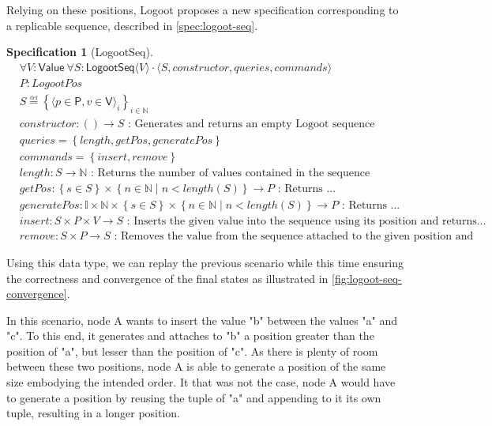 \documentclass{article}
\newcommand{\commands}[1]{commands = \set{#1}}
\newcommand{\defeq}{\overset{\underset{\mathrm{def}}{}}{=}}
\newcommand{\fnspec}[3]{#1: #2 \text{ : #3}}
\newcommand{\inbb}[1]{\in \mathbb{#1}}
\newcommand{\queries}[1]{queries = \set{#1}}
\newcommand{\set}[1]{\left\{#1\right\}} %
\newcommand{\spectuple}[1]{\tuple{#1, constructor, queries, commands}}
\newcommand{\ssep}{\mid} %
\newcommand{\tuple}[1]{\langle #1 \rangle}
\theoremstyle{definition}
\theoremstyle{definition}
\theoremstyle{definition}
\newcounter{specificationcounter}
\theoremstyle{definition}
\newtheorem{specification}[specificationcounter]{Specification}
\begin{document}
Relying on these positions, Logoot proposes a new specification corresponding to a replicable sequence, described in \autoref{spec:logoot-seq}.

\begin{specification}[LogootSeq]
    \begin{align*}
    &\forall V: \mathsf{Value} \ \forall S: \mathsf{LogootSeq} \tuple{V} \cdot \spectuple{S}\\
    &P: LogootPos\\
    &S \defeq \set{\tuple{p \in \mathsf{P}, v \in \mathsf{V}}_i}_{i \inbb{N}}\\
    &\fnspec{constructor}{\left( \right) \to S}{Generates and returns an empty Logoot sequence}\\
    &\queries{length, getPos, generatePos}\\
    &\commands{insert, remove}\\
    &\fnspec{length}{S \to \mathbb{N}}{Returns the number of values contained in the sequence}\\
    &\fnspec{getPos}{\set{s \in S} \times \set{n \inbb{N} \ssep n < length(S)} \to P}{Returns ...}\\
    &\fnspec{generatePos}{\mathbb{I} \times \mathbb{N} \times \set{s \in S} \times \set{n \inbb{N} \ssep n < length(S)} \to P}{Returns ...}\\
    &\fnspec{insert}{S \times P \times V \to S}{Inserts the given value into the sequence using its position and returns...}\\
    &\fnspec{remove}{S \times P \to S}{Removes the value from the sequence attached to the given position and returns...}
    \end{align*}
    \label{spec:logoot-seq}
\end{specification}

Using this data type, we can replay the previous scenario while this time ensuring the correctness and convergence of the final states as illustrated in \autoref{fig:logoot-seq-convergence}.

In this scenario, node A wants to insert the value "b" between the values "a" and "c".
To this end, it generates and attaches to "b" a position greater than the position of "a", but lesser than the position of "c".
As there is plenty of room between these two positions, node A is able to generate a position of the same size embodying the intended order.
It that was not the case, node A would have to generate a position by reusing the tuple of "a" and appending to it its own tuple, resulting in a longer position.
\end{document}

